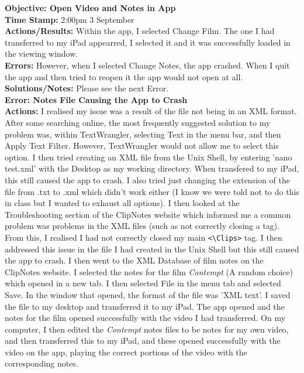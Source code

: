 \documentclass{article}
\begin{document}
\textbf{Objective: Open Video and Notes in App}\\
\textbf{Time Stamp:} 2:00pm 3 September\\
\textbf{Actions/Results:} Within the app, I selected Change Film. The one I had transferred to my iPad appearred, I selected it and it was successfully loaded in the viewing window.\\
\textbf{Errors:} However, when I selected Change Notes, the app crashed. When I quit the app and then tried to reopen it the app would not open at all.\\
\textbf{Solutions/Notes:} Please see the next Error.\\

\textbf{Error: Notes File Causing the App to Crash}\label{crash}\\
\textbf{Actions:} I realised my issue was a result of the file not being in an XML format. After some searching online, the most frequently suggested solution to my problem was, within TextWrangler, selecting Text in the menu bar, and then Apply Text Filter. However, TextWrangler would not allow me to select this option. I then tried creating an XML file from the Unix Shell, by entering 'nano test.xml' with the Desktop as my working directory. When transfered to my iPad, this still caused the app to crash. I also tried just changing the extension of the file from .txt to .xml which didn't work either (I know we were told not to do this in class but I wanted to exhaust all options). I then looked at the Troubleshooting section of the ClipNotes website which informed me a common problem was problems in the XML files (such as not correctly closing a tag). From this, I realised I had not correctly closed my main \verb|<\Clips>| tag. I then addressed this issue in the file I had created in the Unix Shell but this still caused the app to crash. I then went to the XML Database of film notes on the ClipNotes website. I selected the notes for the film \textit{Contempt} (A random choice) which opened in a new tab. I then selected File in the menu tab and selected Save. In the window that opened, the format of the file was 'XML text'. I saved the file to my desktop and transferred it to my iPad. The app opened and the notes for the film opened successfully with the video I had transferred. On my computer, I then edited the \textit{Contempt} notes files to be notes for my own video, and then transferred this to my iPad, and these opened successfully with the video on the app, playing the correct portions of the video with the corresponding notes.
\end{document}
